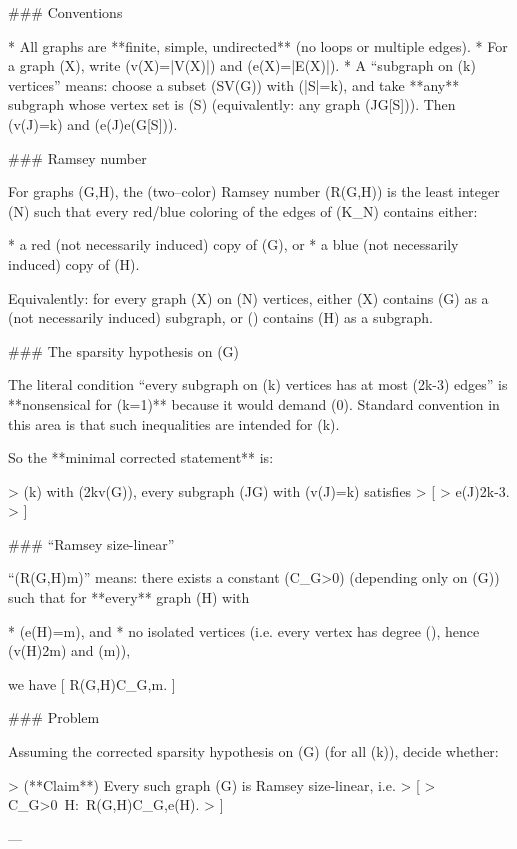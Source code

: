 ### Conventions

* All graphs are **finite, simple, undirected** (no loops or multiple edges).
* For a graph (X), write (v(X)=|V(X)|) and (e(X)=|E(X)|).
* A “subgraph on (k) vertices” means: choose a subset (S\subseteq V(G)) with (|S|=k), and take **any** subgraph whose vertex set is (S) (equivalently: any graph (J\subseteq G[S])). Then (v(J)=k) and (e(J)\le e(G[S])).

### Ramsey number

For graphs (G,H), the (two–color) Ramsey number (R(G,H)) is the least integer (N) such that every red/blue coloring of the edges of (K_N) contains either:

* a red (not necessarily induced) copy of (G), or
* a blue (not necessarily induced) copy of (H).

Equivalently: for every graph (X) on (N) vertices, either (X) contains (G) as a (not necessarily induced) subgraph, or () contains (H) as a subgraph.

### The sparsity hypothesis on (G)

The literal condition “every subgraph on (k) vertices has at most (2k-3) edges” is **nonsensical for (k=1)** because it would demand (0). Standard convention in this area is that such inequalities are intended for (k).

So the **minimal corrected statement** is:

> (\forall k\in{}) with (2\le k\le v(G)), every subgraph (J\subseteq G) with (v(J)=k) satisfies
> [
> e(J)\le 2k-3.
> ]

### “Ramsey size-linear”

“(R(G,H)\ll m)” means: there exists a constant (C_G>0) (depending only on (G)) such that for **every** graph (H) with

* (e(H)=m), and
* no isolated vertices (i.e. every vertex has degree (), hence (v(H)\le 2m) and (m)),

we have
[
R(G,H)\le C_G,m.
]

### Problem

Assuming the corrected sparsity hypothesis on (G) (for all (k)), decide whether:

> (**Claim**) Every such graph (G) is Ramsey size-linear, i.e.
> [
> \exists C_G>0\ \forall H:\ R(G,H)\le C_G,e(H).
> ]

---

